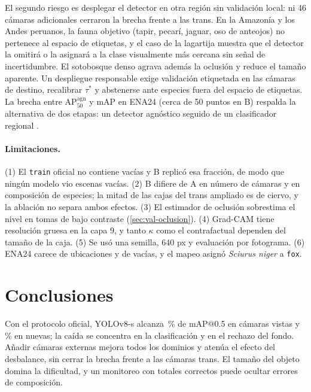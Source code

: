 \documentclass{article}
\begin{document}
El segundo riesgo es desplegar el detector en otra región sin validación local: ni 46 cámaras adicionales cerraron la brecha frente a las trans. En la Amazonía y los Andes peruanos, la fauna objetivo (tapir, pecarí, jaguar, oso de anteojos) no pertenece al espacio de etiquetas, y el caso de la lagartija muestra que el detector la omitirá o la asignará a la clase visualmente más cercana sin señal de incertidumbre. El sotobosque denso agrava además la oclusión y reduce el tamaño aparente. Un despliegue responsable exige validación etiquetada en las cámaras de destino, recalibrar \(\tau^\ast\) y abstenerse ante especies fuera del espacio de etiquetas. La brecha entre AP\(^{\mathrm{agn}}_{50}\) y mAP en ENA24 (cerca de 50 puntos en B) respalda la alternativa de dos etapas: un detector agnóstico seguido de un clasificador regional \parencite{beery2019megadetector,shepley2021}.

\paragraph{Limitaciones.} (1) El \texttt{train} oficial no contiene vacías y B replicó esa fracción, de modo que ningún modelo vio escenas vacías. (2) B difiere de A en número de cámaras y en composición de especies; la mitad de las cajas del trans ampliado es de ciervo, y la ablación no separa ambos efectos. (3) El estimador de oclusión sobrestima el nivel en tomas de bajo contraste (\cref{sec:val-oclusion}). (4) Grad-CAM tiene resolución gruesa en la capa 9, y tanto \(\kappa\) como el contrafactual dependen del tamaño de la caja. (5) Se usó una semilla, 640 px y evaluación por fotograma. (6) ENA24 carece de ubicaciones y de vacías, y el mapeo asignó \emph{Sciurus niger} a \texttt{fox}.

\section{Conclusiones}
\label{sec:conclusiones}
Con el protocolo oficial, YOLOv8-s alcanza \mapCisCincA\,\% de mAP@0.5 en cámaras vistas y \mapTransCincA\,\% en nuevas; la caída se concentra en la clasificación y en el rechazo del fondo. Añadir cámaras externas mejora todos los dominios y atenúa el efecto del desbalance, sin cerrar la brecha frente a las cámaras trans. El tamaño del objeto domina la dificultad, y un monitoreo con totales correctos puede ocultar errores de composición.

\printbibliography[title=Referencias]
\end{document}
